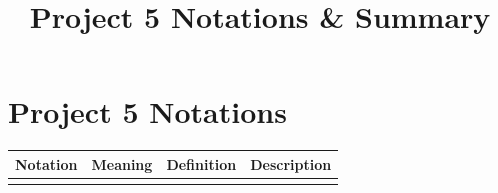 \documentclass[11pt,a4paper]{article}
\title{\vspace{-1cm}\textbf{Project 5 Notations \& Summary}\vspace{-0.5cm}}
\author{}
\date{}
\begin{document}
\maketitle
\vspace{-0.5cm}

\section*{Project 5 Notations}

\begin{small}
\renewcommand{\arraystretch}{1.25}
\begin{xltabular}{\textwidth}{@{} c >{\hsize\raggedright\arraybackslash}X >{\hsize\raggedright\arraybackslash}X >{\hsize\raggedright\arraybackslash}X @{}}
\toprule
\textbf{Notation} & \textbf{Meaning} & \textbf{Definition} & \textbf{Description} \\
\midrule
\endhead
\bottomrule
\endfoot


\end{xltabular}
\end{small}
\end{document}
